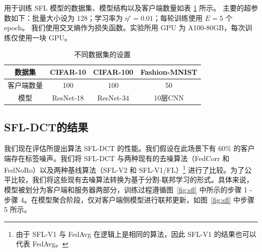 用于训练 SFL 模型的数据集、模型结构以及客户端数量如表 \ref{table:hyper-parameters} 所示。
主要的超参数如下：批量大小设为 128；学习率为 $\eta^r=0.01$；每轮训练使用 $E=5$ 个 epoch。
我们使用交叉熵作为损失函数。实验所用 GPU 为 A100-80GB，每次训练仅使用一块 GPU。
\begin{table}[t]
\caption{不同数据集的设置}
\begin{center}
\begin{tabular}{cccc}
\hline
数据集 & CIFAR-10 & CIFAR-100 & Fashion-MNIST \\ \hline
客户端数量 & 100 & 100 & 50 \\ 
模型 & ResNet-18 & ResNet-34 & 10层CNN \\ \hline
\end{tabular}
\label{table:hyper-parameters}
\end{center}
\end{table}
\subsection{SFL-DCT的结果}

我们现在评估所提出算法 SFL-DCT 的性能。我们假设在此场景下有 60\% 的客户端存在标签噪声\cite{b9,ji2024fedfixer,li2024feddiv}。我们将 SFL-DCT 与两种现有的去噪算法（FedCorr\cite{b9} 和 FedNoRo\cite{wu2023fednoro}）以及两种基线算法（SFL-V2 和 SFL-V1/FL）\footnote{由于 SFL-V1 与 FedAvg 在逻辑上是相同的算法，因此 SFL-V1 的结果也可以代表 FedAvg。}\cite{thapa2022splitfed} 进行了比较。为了公平比较，我们将这些现有去噪算法转换为基于分割-联邦学习的形式。具体来说，模型被划分为客户端和服务器两部分，训练过程遵循图~\ref{fig:sfl} 中所示的步骤 1 - 步骤 4。在模型聚合阶段，仅对客户端侧模型进行联邦更新，如图~\ref{fig:sfl} 中步骤 5 所示。


